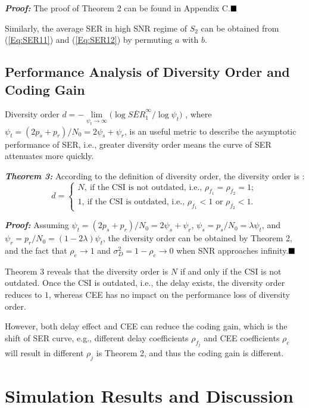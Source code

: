 \documentclass[onecolumn,letterpaper,11pt,draftclsnofoot]{IEEEtran}
\begin{document}
 \emph{\textbf{Proof: }}The proof of Theorem 2 can be found in
Appendix C.$\hfill \blacksquare$

 Similarly, the average SER in high SNR regime of $S_2$ can be obtained from
(\ref{Eq:SER11}) and (\ref{Eq:SER12}) by permuting $a$ with $b$.

\subsection{Performance Analysis of Diversity Order and Coding Gain}

Diversity order $d =  - \mathop {\lim }\limits_{\psi _t \to \infty }
\big( {\log \overline {SER} _1^\infty  /\log \psi _t } \big) $
\cite{Zheng2003}, where
$\psi_t=\left(2p_s+p_r\right)/N_0=2\psi_s+\psi_r$, is an useful
metric to describe the asymptotic performance of SER, i.e., greater
diversity order means the curve of SER attenuates more quickly.


\emph{\textbf{Theorem 3:}} According to the definition of diversity
order, the diversity order is :
\begin{equation}
d =
\begin{cases}
  N, ~\text{if the CSI is not outdated, i.e.,~} \rho_{f_1}=\rho_{f_2}=1; \\
  1, ~\text{if the CSI is outdated, i.e.,~} \rho_{f_1}<1 \text{~or~}\rho_{f_2}<1.
\end{cases}
\end{equation}

 \emph{\textbf{Proof: }} Assuming $\psi_t=\left(2p_s+p_r\right)/N_0=2\psi_s+\psi_r$,
$\psi_s=p_s/N_0=\lambda \psi_t$, and
$\psi_r=p_r/N_0=\left(1-2\lambda\right) \psi_t$, the diversity order
can be obtained by Theorem 2, and the fact that $\rho_e \to 1$ and
$\sigma_D^2=1-\rho_e \to 0$ when SNR approaches infinity.$\hfill
\blacksquare$

Theorem 3 reveals that the diversity order is $N$ if and only if the
CSI is not outdated. Once the CSI is outdated, i.e., the delay
exists, the diversity order reduces to $1$, whereas CEE has no
impact on the performance loss of diversity order.

However, both delay effect and CEE can reduce the coding gain, which
is the shift of SER curve, e.g., different delay
coefficients $\rho_{f_j}$ and CEE coefficients $\rho_e$ will result
in different $\rho_j$ is Theorem 2, and thus the coding gain is
different.

\section{Simulation Results and Discussion}
\end{document}
